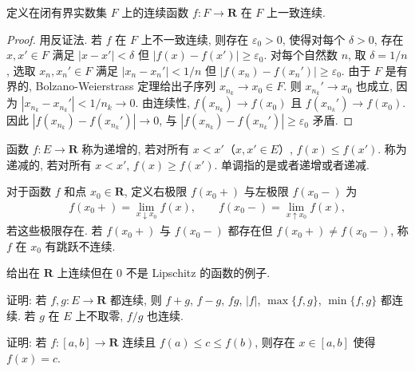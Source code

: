 \documentclass[../../main.tex]{subfiles}
\begin{document}
\begin{theorem}\label{theorem:ch01-一致连续}
定义在闭有界实数集 $F$ 上的连续函数 $f:F\to\mathbf{R}$ 在 $F$ 上一致连续.
\end{theorem}

\begin{proof}
用反证法. 若 $f$ 在 $F$ 上不一致连续, 则存在 $\varepsilon_{0}>0$, 使得对每个 $\delta>0$, 存在 $x,x'\in F$ 满足 $|x-x'|<\delta$ 但 $|f(x)-f(x')|\geqslant\varepsilon_{0}$. 对每个自然数 $n$, 取 $\delta=1/n$, 选取 $x_{n},x_{n}'\in F$ 满足 $|x_{n}-x_{n}'|<1/n$ 但 $|f(x_{n})-f(x_{n}')|\geqslant\varepsilon_{0}$. 由于 $F$ 是有界的, Bolzano-Weierstrass 定理给出子序列 $x_{n_{k}}\to x_{0}\in F$. 则 $x_{n_{k}}'\to x_{0}$ 也成立, 因为 $|x_{n_{k}}-x_{n_{k}}'|<1/n_{k}\to 0$. 由连续性, $f(x_{n_{k}})\to f(x_{0})$ 且 $f(x_{n_{k}}')\to f(x_{0})$. 因此 $|f(x_{n_{k}})-f(x_{n_{k}}')|\to 0$, 与 $|f(x_{n_{k}})-f(x_{n_{k}}')|\geqslant\varepsilon_{0}$ 矛盾.
\end{proof}

\begin{definition}[递增、递减、单调]\label{definition:ch01-单调函数}
函数 $f:E\to\mathbf{R}$ 称为递增的, 若对所有 $x<x'$（$x,x'\in E$）, $f(x)\leqslant f(x')$. 称为递减的, 若对所有 $x<x'$, $f(x)\geqslant f(x')$. 单调指的是或者递增或者递减.
\end{definition}

对于函数 $f$ 和点 $x_{0}\in\mathbf{R}$, 定义右极限 $f(x_{0}+)$ 与左极限 $f(x_{0}-)$ 为
\begin{align*}
f(x_{0}+)=\lim_{x\downarrow x_{0}}f(x),\qquad f(x_{0}-)=\lim_{x\uparrow x_{0}}f(x),
\end{align*}
若这些极限存在. 若 $f(x_{0}+)$ 与 $f(x_{0}-)$ 都存在但 $f(x_{0}+)\neq f(x_{0}-)$, 称 $f$ 在 $x_{0}$ 有跳跃不连续.

\begin{exercise}\label{exercise:ch01-47}
给出在 $\mathbf{R}$ 上连续但在 $0$ 不是 Lipschitz 的函数的例子.
\end{exercise}

\begin{exercise}\label{exercise:ch01-48}
证明: 若 $f,g:E\to\mathbf{R}$ 都连续, 则 $f+g$, $f-g$, $fg$, $|f|$, $\max\{f,g\}$, $\min\{f,g\}$ 都连续. 若 $g$ 在 $E$ 上不取零, $f/g$ 也连续.
\end{exercise}

\begin{exercise}\label{exercise:ch01-49}
证明: 若 $f:[a,b]\to\mathbf{R}$ 连续且 $f(a)\leqslant c\leqslant f(b)$, 则存在 $x\in[a,b]$ 使得 $f(x)=c$.
\end{exercise}
\end{document}
